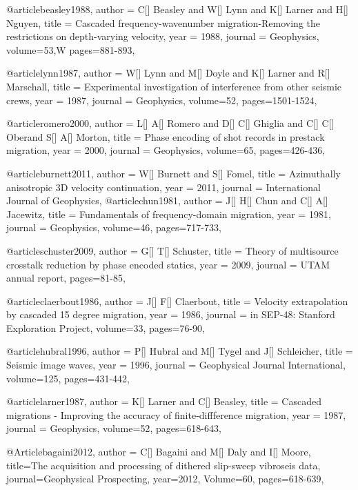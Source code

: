 {@article{beasley1988,
  author =	 {C[] Beasley and W[] Lynn and K[] Larner and H[] Nguyen},
  title =	 {Cascaded frequency-wavenumber migration-Removing the restrictions on depth-varying velocity},
  year =	 1988,
  journal =	 {Geophysics},
  volume={53},W
 pages=881-893,
}

@article{lynn1987,
  author =	 {W[] Lynn and M[] Doyle and K[] Larner and R[] Marschall},
  title =	 {Experimental investigation of interference from other seismic crews},
  year =	 1987,
  journal =	 {Geophysics},
  volume={52},
 pages=1501-1524,
}

@article{romero2000,
  author =	 {L[] A[] Romero and D[] C[] Ghiglia and C[] C[] Oberand S[] A[] Morton},
  title =	 {Phase encoding of shot records in prestack migration},
  year =	 2000,
  journal =	 {Geophysics},
  volume={65},
 pages=426-436,
}

@article{burnett2011,
  author =	 {W[] Burnett and S[] Fomel},
  title =	 {Azimuthally anisotropic 3{D} velocity continuation},
  year =	 2011,
  journal =	 {International Journal of Geophysics},
}
@article{chun1981,
  author =	 {J[] H[] Chun and C[] A[] Jacewitz},
  title =	 {Fundamentals of frequency-domain migration},
  year =	 1981,
  journal =	 {Geophysics},
  volume={46},
 pages=717-733,
}

@article{schuster2009,
  author =	 {G[] T[] Schuster},
  title =	 {Theory of multisource crosstalk reduction by phase encoded statics},
  year =	 2009,
  journal =	 {UTAM annual report},
 pages=81-85,
}

@article{claerbout1986,
  author =	 {J[] F[] Claerbout},
  title =	 {Velocity extrapolation by cascaded 15 degree migration},
  year =	 1986,
  journal =	 {in SEP-48: Stanford Exploration Project},
  volume={33},
 pages=76-90,
}

@article{hubral1996,
  author =	 {P[] Hubral and M[] Tygel and J[] Schleicher},
  title =	 {Seismic image waves},
  year =	 1996,
  journal =	 {Geophysical Journal International},
  volume={125},
 pages=431-442,
}

@article{larner1987,
  author =	 {K[] Larner and C[] Beasley},
  title =	 {Cascaded migrations - Improving the accuracy of finite-diffference migration},
  year =	 1987,
  journal =	 {Geophysics},
  volume={52},
 pages=618-643,
}

@Article{bagaini2012,
  author = {C[] Bagaini and M[] Daly and I[] Moore},
  title={The acquisition and processing of dithered slip-sweep vibroseis data},
  journal={Geophysical Prospecting},
  year=2012,
  Volume=60,
  pages={618-639},
}

}
